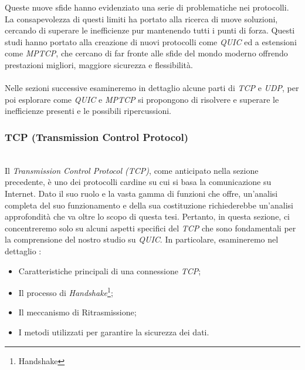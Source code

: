 \noindent Queste nuove sfide hanno evidenziato una serie di problematiche nei protocolli. La consapevolezza di questi limiti ha portato alla ricerca di nuove soluzioni, cercando di superare le inefficienze pur mantenendo tutti i punti di forza.
Questi studi hanno portato alla creazione di nuovi protocolli come \emph{QUIC} ed a estensioni come \emph{MPTCP}, che cercano di far fronte alle sfide del mondo moderno offrendo prestazioni migliori, maggiore sicurezza e flessibilità.
\\
\\
Nelle sezioni successive esamineremo in dettaglio alcune parti di \emph{TCP} e \emph{UDP}, per poi esplorare come \emph{QUIC} e \emph{MPTCP} si propongono di risolvere e superare le inefficienze presenti e le possibili ripercussioni.

\subsubsection{TCP (Transmission Control Protocol)}
~\\
\indent Il \emph{Transmission Control Protocol (TCP)}, come anticipato nella sezione precedente, è uno dei protocolli cardine su cui si basa la comunicazione su Internet. Dato il suo ruolo e la vasta gamma di funzioni che offre, un'analisi completa del suo funzionamento e della sua costituzione richiederebbe un'analisi approfondità che va oltre lo scopo di questa tesi. Pertanto, in questa sezione, ci concentreremo solo su alcuni aspetti specifici del \emph{TCP} che sono fondamentali per la comprensione del nostro studio su \emph{QUIC}. 
In particolare, esamineremo nel dettaglio :
\begin{itemize}
    \item Caratteristiche principali di una connessione \emph{TCP};
    
    \item Il processo di \emph{Handshake}\footnote{\gls{Handshake}};
    
    \item Il meccanismo di Ritrasmissione;
    
    \item I metodi utilizzati per garantire la sicurezza dei dati.
\end{itemize}

